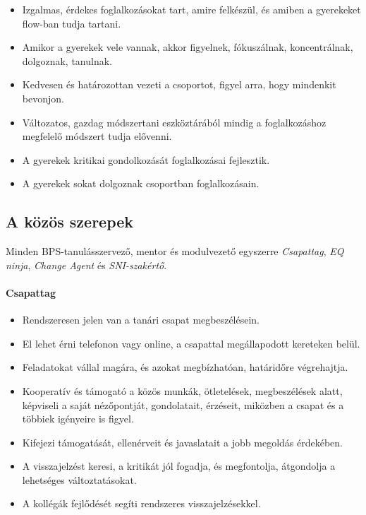 \begin{itemize}

    \item
          Izgalmas, érdekes foglalkozásokat tart, amire felkészül, és amiben a gyerekeket flow-ban tudja tartani.
    \item
          Amikor a gyerekek vele vannak, akkor figyelnek, fókuszálnak, koncentrálnak, dolgoznak, tanulnak.
    \item
          Kedvesen és határozottan vezeti a csoportot, figyel arra, hogy mindenkit bevonjon.
    \item Változatos, gazdag módszertani eszköztárából mindig a foglalkozáshoz megfelelő módszert tudja elővenni.
    \item  A gyerekek kritikai gondolkozását foglalkozásai fejlesztik.
    \item A gyerekek sokat dolgoznak csoportban foglalkozásain.
    
\end{itemize}

\subsection{A közös szerepek}

Minden BPS-tanulásszervező, mentor és modulvezető egyszerre  \emph{Csapattag}, \emph{EQ ninja}, \emph{Change Agent} és \emph{SNI-szakértő}. 

\paragraph{Csapattag}

\begin{itemize}

    \item
          Rendszeresen jelen van a tanári csapat megbeszélésein.
    \item
          El lehet érni telefonon vagy online, a csapattal megállapodott kereteken belül.
    \item
          Feladatokat vállal magára, és azokat megbízhatóan, határidőre végrehajtja.
    \item
          Kooperatív és támogató a közös munkák, ötletelések, megbeszélések alatt, képviseli a saját nézőpontját, gondolatait, érzéseit, miközben a csapat és a többiek igényeire is figyel.
    \item
          Kifejezi támogatását, ellenérveit és javaslatait a jobb megoldás érde\-kében.
    \item
          A visszajelzést keresi, a kritikát jól fogadja, és megfontolja, átgondolja a lehetséges változtatásokat.
    \item
          A kollégák fejlődését segíti rendszeres visszajelzésekkel.
\end{itemize}

